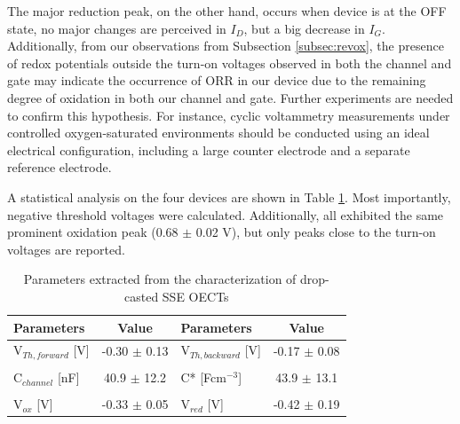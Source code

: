 The major reduction peak, on the other hand, occurs when device is at the OFF state, no major changes are perceived in $I_{D}$, but a big decrease in $I_{G}$. Additionally, from our observations from Subsection \ref{subsec:revox}, the presence of redox potentials outside the turn-on voltages observed in both the channel and gate may indicate the occurrence of ORR in our device due to the remaining degree of oxidation in both our channel and gate. Further experiments are needed to confirm this hypothesis. For instance, cyclic voltammetry measurements under controlled oxygen-saturated environments should be conducted using an ideal electrical configuration, including a large counter electrode and a separate reference electrode.

A statistical analysis on the four devices are shown in Table \ref{tab:dropfom}. Most importantly, negative threshold voltages were calculated. Additionally, all exhibited the same prominent oxidation peak (0.68 $\pm$ 0.02 V), but only peaks close to the turn-on voltages are reported. %


\begin{table}[ht]
\centering
\caption{Parameters extracted from the characterization of drop-casted SSE OECTs}
\begin{tabular}{l|c||l|c}
Parameters & Value & Parameters & Value \\\hline \hline
V$_{Th,forward}$ [V] & -0.30 $\pm$ 0.13 & V$_{Th,backward}$ [V] & -0.17 $\pm$ 0.08\\
& & &\\[-1em]
C$_{channel}$ [nF] & 40.9 $\pm$ 12.2 & C* [Fcm$^{-3}$] &  43.9 $\pm$ 13.1 \\
& & &\\[-1em]
V$_{ox}$ [V] & -0.33 $\pm$ 0.05 & V$_{red}$ [V] & -0.42 $\pm$ 0.19 %
\\\hline
\end{tabular}
\label{tab:dropfom}
\end{table}

